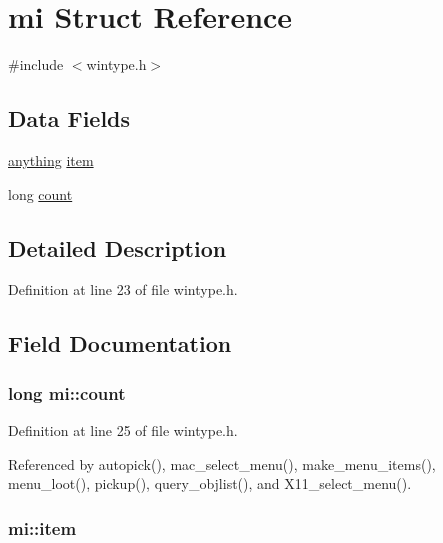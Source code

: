 \hypertarget{structmi}{\section{mi Struct Reference}
\label{structmi}
}


{\ttfamily \#include $<$wintype.\+h$>$}

\subsection*{Data Fields}
\begin{DoxyCompactItemize}
\item 
\hyperlink{wintype_8h_a49720928e6af182ee38aa332d0483b2a}{anything} \hyperlink{structmi_a24f26cd1b01d3cf3ed16b1fd020d3a08}{item}
\item 
long \hyperlink{structmi_a008e5c33aa571223ec592e0725c5fb73}{count}
\end{DoxyCompactItemize}


\subsection{Detailed Description}


Definition at line 23 of file wintype.\+h.



\subsection{Field Documentation}
\hypertarget{structmi_a008e5c33aa571223ec592e0725c5fb73}{
\subsubsection[{count}]{\setlength{\rightskip}{0pt plus 5cm}long mi\+::count}}\label{structmi_a008e5c33aa571223ec592e0725c5fb73}


Definition at line 25 of file wintype.\+h.



Referenced by autopick(), mac\+\_\+select\+\_\+menu(), make\+\_\+menu\+\_\+items(), menu\+\_\+loot(), pickup(), query\+\_\+objlist(), and X11\+\_\+select\+\_\+menu().

\hypertarget{structmi_a24f26cd1b01d3cf3ed16b1fd020d3a08}{
\subsubsection[{item}]{ mi\+::item}}\label{structmi_a24f26cd1b01d3cf3ed16b1fd020d3a08}



